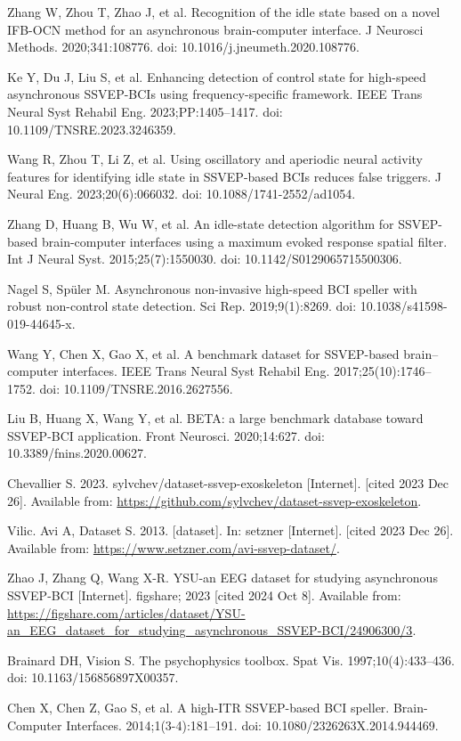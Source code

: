 \documentclass[11pt]{ctexart}
\begin{document}
\begin{enumerate}[label={[\arabic{enumi}]}, leftmargin=3.2em, itemsep=2pt]
\item Zhang W, Zhou T, Zhao J, et al. Recognition of the idle state based on a novel IFB-OCN method for an asynchronous brain-computer interface. J Neurosci Methods. 2020;341:108776. doi: 10.1016/j.jneumeth.2020.108776.
\item Ke Y, Du J, Liu S, et al. Enhancing detection of control state for high-speed asynchronous SSVEP-BCIs using frequency-specific framework. IEEE Trans Neural Syst Rehabil Eng. 2023;PP:1405--1417. doi: 10.1109/TNSRE.2023.3246359.
\item Wang R, Zhou T, Li Z, et al. Using oscillatory and aperiodic neural activity features for identifying idle state in SSVEP-based BCIs reduces false triggers. J Neural Eng. 2023;20(6):066032. doi: 10.1088/1741-2552/ad1054.
\item Zhang D, Huang B, Wu W, et al. An idle-state detection algorithm for SSVEP-based brain-computer interfaces using a maximum evoked response spatial filter. Int J Neural Syst. 2015;25(7):1550030. doi: 10.1142/S0129065715500306.
\item Nagel S, Sp\"uler M. Asynchronous non-invasive high-speed BCI speller with robust non-control state detection. Sci Rep. 2019;9(1):8269. doi: 10.1038/s41598-019-44645-x.
\item Wang Y, Chen X, Gao X, et al. A benchmark dataset for SSVEP-based brain--computer interfaces. IEEE Trans Neural Syst Rehabil Eng. 2017;25(10):1746--1752. doi: 10.1109/TNSRE.2016.2627556.
\item Liu B, Huang X, Wang Y, et al. BETA: a large benchmark database toward SSVEP-BCI application. Front Neurosci. 2020;14:627. doi: 10.3389/fnins.2020.00627.
\item Chevallier S. 2023. sylvchev/dataset-ssvep-exoskeleton [Internet]. [cited 2023 Dec 26]. Available from: \url{https://github.com/sylvchev/dataset-ssvep-exoskeleton}.
\item Vilic. Avi A, Dataset S. 2013. [dataset]. In: setzner [Internet]. [cited 2023 Dec 26]. Available from: \url{https://www.setzner.com/avi-ssvep-dataset/}.
\item Zhao J, Zhang Q, Wang X-R. YSU-an EEG dataset for studying asynchronous SSVEP-BCI [Internet]. figshare; 2023 [cited 2024 Oct 8]. Available from: \url{https://figshare.com/articles/dataset/YSU-an_EEG_dataset_for_studying_asynchronous_SSVEP-BCI/24906300/3}.
\item Brainard DH, Vision S. The psychophysics toolbox. Spat Vis. 1997;10(4):433--436. doi: 10.1163/156856897X00357.
\item Chen X, Chen Z, Gao S, et al. A high-ITR SSVEP-based BCI speller. Brain-Computer Interfaces. 2014;1(3-4):181--191. doi: 10.1080/2326263X.2014.944469.

\end{enumerate}
\end{document}
